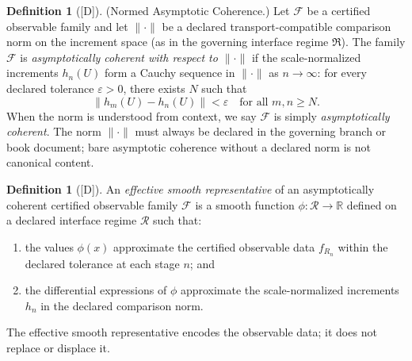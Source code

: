\documentclass[12pt,oneside]{amsbook}
\theoremstyle{plain}
\theoremstyle{definition}
\newtheorem{definition}[theorem]{Definition}
\theoremstyle{remark}
\newcommand{\status}[1]{\textup{[#1]}}
\begin{document}
\begin{definition}[\status{D}]\label{def:asymptotic-coherence}
\textup{(Normed Asymptotic Coherence.)}
Let $\mathcal{F}$ be a certified observable family and let
$\|\cdot\|$ be a declared transport-compatible comparison norm on
the increment space (as in the governing interface regime
$\mathfrak{R}$).  The family $\mathcal{F}$ is \emph{asymptotically
coherent with respect to $\|\cdot\|$} if the scale-normalized
increments $h_n(U)$ form a Cauchy sequence in $\|\cdot\|$ as
$n \to \infty$: for every declared tolerance $\varepsilon > 0$,
there exists $N$ such that
\[
  \|h_m(U) - h_n(U)\| < \varepsilon
  \quad\text{for all } m, n \geq N.
\]
When the norm is understood from context, we say $\mathcal{F}$
is simply \emph{asymptotically coherent}.  The norm $\|\cdot\|$
must always be declared in the governing branch or book document;
bare asymptotic coherence without a declared norm is not canonical
content.
\end{definition}

\begin{definition}[\status{D}]\label{def:effective-smooth}
An \emph{effective smooth representative} of an asymptotically
coherent certified observable family $\mathcal{F}$ is a smooth
function $\phi: \mathcal{R} \to \mathbb{R}$ defined on a declared
interface regime $\mathcal{R}$ such that:
\begin{enumerate}[label=\textup{(\arabic*)}]
  \item the values $\phi(x)$ approximate the certified observable
        data $f_{R_n}$ within the declared tolerance at each stage
        $n$; and
  \item the differential expressions of $\phi$ approximate the
        scale-normalized increments $h_n$ in the declared comparison
        norm.
\end{enumerate}
The effective smooth representative encodes the observable data; it
does not replace or displace it.
\end{definition}
\end{document}
